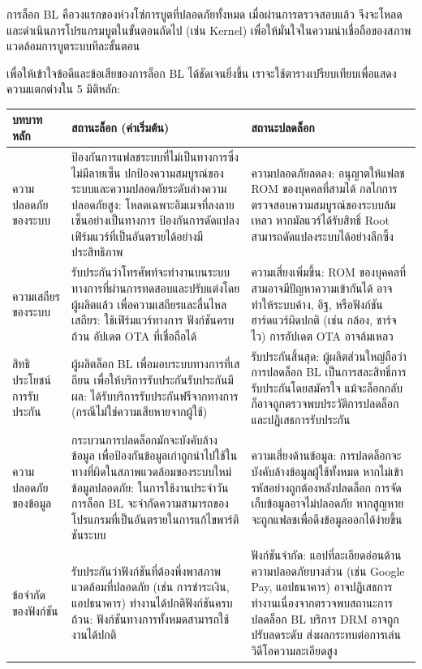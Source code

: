 
การล็อก BL คือวงแรกของห่วงโซ่การบูตที่ปลอดภัยทั้งหมด เมื่อผ่านการตรวจสอบแล้ว จึงจะโหลดและดำเนินการโปรแกรมบูตในขั้นตอนถัดไป (เช่น Kernel) เพื่อให้มั่นใจในความน่าเชื่อถือของสภาพแวดล้อมการบูตระบบทีละขั้นตอน


เพื่อให้เข้าใจข้อดีและข้อเสียของการล็อก BL ได้ชัดเจนยิ่งขึ้น เราจะใช้ตารางเปรียบเทียบเพื่อแสดงความแตกต่างใน 5 มิติหลัก:

\begin{center}
\begin{tabularx}{\linewidth}{|X|X|X|}
\hline
\textbf{บทบาทหลัก} & \textbf{สถานะล็อก (ค่าเริ่มต้น)} & \textbf{สถานะปลดล็อก} \tabularnewline
\hline
ความปลอดภัยของระบบ & ป้องกันการแฟลชระบบที่ไม่เป็นทางการซึ่งไม่มีลายเซ็น ปกป้องความสมบูรณ์ของระบบและความปลอดภัยระดับล่าง\newline ความปลอดภัยสูง: โหลดเฉพาะอิมเมจที่ลงลายเซ็นอย่างเป็นทางการ ป้องกันการดัดแปลงเฟิร์มแวร์ที่เป็นอันตรายได้อย่างมีประสิทธิภาพ & ความปลอดภัยลดลง: อนุญาตให้แฟลช ROM ของบุคคลที่สามได้ กลไกการตรวจสอบความสมบูรณ์ของระบบล้มเหลว หากมัลแวร์ได้รับสิทธิ์ Root สามารถดัดแปลงระบบได้อย่างลึกซึ้ง \tabularnewline
ความเสถียรของระบบ & รับประกันว่าโทรศัพท์จะทำงานบนระบบทางการที่ผ่านการทดสอบและปรับแต่งโดยผู้ผลิตแล้ว เพื่อความเสถียรและลื่นไหล\newline เสถียร: ใช้เฟิร์มแวร์ทางการ ฟังก์ชันครบถ้วน อัปเดต OTA ที่เชื่อถือได้ & ความเสี่ยงเพิ่มขึ้น: ROM ของบุคคลที่สามอาจมีปัญหาความเข้ากันได้ อาจทำให้ระบบค้าง, อิฐ, หรือฟังก์ชันฮาร์ดแวร์ผิดปกติ (เช่น กล้อง, ชาร์จไว) การอัปเดต OTA อาจล้มเหลว \tabularnewline
สิทธิประโยชน์การรับประกัน & ผู้ผลิตล็อก BL เพื่อมอบระบบทางการที่เสถียน เพื่อให้บริการรับประกัน\newline รับประกันมีผล: ได้รับบริการรับประกันฟรีจากทางการ (กรณีไม่ใช่ความเสียหายจากผู้ใช้) & รับประกันสิ้นสุด: ผู้ผลิตส่วนใหญ่ถือว่าการปลดล็อก BL เป็นการสละสิทธิ์การรับประกันโดยสมัครใจ แม้จะล็อกกลับ ก็อาจถูกตรวจพบประวัติการปลดล็อกและปฏิเสธการรับประกัน \tabularnewline
ความปลอดภัยของข้อมูล & กระบวนการปลดล็อกมักจะบังคับล้างข้อมูล เพื่อป้องกันข้อมูลเก่าถูกนำไปใช้ในทางที่ผิดในสภาพแวดล้อมของระบบใหม่\newline ข้อมูลปลอดภัย: ในการใช้งานประจำวัน การล็อก BL จะจำกัดความสามารถของโปรแกรมที่เป็นอันตรายในการแก้ไขพาร์ติชันระบบ & ความเสี่ยงด้านข้อมูล: การปลดล็อกจะบังคับล้างข้อมูลผู้ใช้ทั้งหมด หากไม่เข้ารหัสอย่างถูกต้องหลังปลดล็อก การจัดเก็บข้อมูลอาจไม่ปลอดภัย หากสูญหายจะถูกแฟลชเพื่อดึงข้อมูลออกได้ง่ายขึ้น \tabularnewline
ข้อจำกัดของฟังก์ชัน & รับประกันว่าฟังก์ชันที่ต้องพึ่งพาสภาพแวดล้อมที่ปลอดภัย (เช่น การชำระเงิน, แอปธนาคาร) ทำงานได้ปกติ\newline ฟังก์ชันครบถ้วน: ฟังก์ชันทางการทั้งหมดสามารถใช้งานได้ปกติ & ฟังก์ชันจำกัด: แอปที่ละเอียดอ่อนด้านความปลอดภัยบางส่วน (เช่น Google Pay, แอปธนาคาร) อาจปฏิเสธการทำงานเนื่องจากตรวจพบสถานะการปลดล็อก BL บริการ DRM อาจถูกปรับลดระดับ ส่งผลกระทบต่อการเล่นวิดีโอความละเอียดสูง \tabularnewline
\hline
\end{tabularx}
\end{center}


